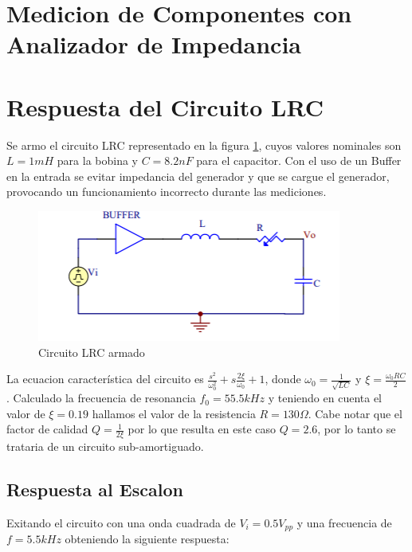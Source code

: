 



\onehalfspacing



\section{Medicion de Componentes con Analizador de Impedancia}


\section{Respuesta del Circuito LRC}

Se armo el circuito LRC representado en la figura \ref{fig:LRC2}, cuyos valores nominales son $L=1mH$ para la bobina y $C=8.2nF$ para el capacitor. Con el uso de un Buffer en la entrada se evitar impedancia del generador y que se cargue el generador, provocando un funcionamiento incorrecto durante las mediciones.

\begin{figure}[h!]
\centering
\includegraphics[scale=0.5]{lrcCircuito.png}
\caption{Circuito LRC armado}
\label{fig:LRC2}
\end{figure}

La ecuacion característica del circuito es $\frac{s^2}{\omega_0^2}+s\frac{2\xi}{\omega_0}+1$, donde $\omega_0 = \frac{1}{\sqrt{LC}}$ y $\xi = \frac{\omega_0RC}{2}$. Calculado la frecuencia de resonancia $f_0=55.5kHz$ y teniendo en cuenta el valor de $\xi = 0.19$ hallamos el valor de la resistencia $R = 130\Omega$. Cabe notar que el factor de calidad $Q = \frac{1}{2\xi}$ por lo que resulta en este caso $Q = 2.6$, por lo tanto se trataria de un circuito sub-amortiguado. 

\subsection{Respuesta al Escalon}

Exitando el circuito con una onda cuadrada de $V_i = 0.5V_{pp}$ y una frecuencia de $f = 5.5kHz$ obteniendo la siguiente respuesta:

